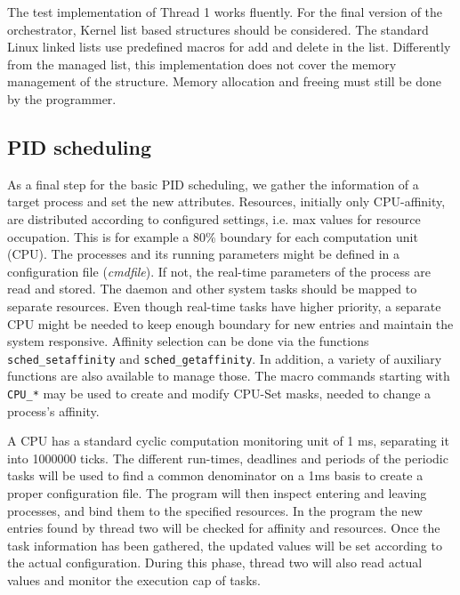 \documentclass[]{scrartcl}
\begin{document}
The test implementation of Thread 1 works fluently. For the final version of the orchestrator, Kernel list based structures should be considered. 
The standard Linux linked lists use predefined macros for add and delete in the list. Differently from the managed list, this implementation does not cover the memory management of the structure. Memory allocation and freeing must still be done by the programmer.

\subsection{PID scheduling}
 
As a final step for the basic PID scheduling, we gather the information of a target process and set the new attributes. 
Resources, initially only {CPU}-affinity, are distributed according to configured settings, i.e. max values for resource occupation. 
This is for example a 80\% boundary for each computation unit ({CPU}). 
The processes and its running parameters might be defined in a configuration file (\textit{cmdfile}). If not, the real-time parameters of the process are read and stored.
The daemon and other system tasks should be mapped to separate resources. Even though real-time tasks have higher priority, a separate CPU might be needed to keep enough boundary for new entries and maintain the system responsive.
Affinity selection can be done via the functions \texttt{sched\_setaffinity} and \texttt{sched\_getaffinity}.
In addition, a variety of auxiliary functions are also available to manage those. 
The macro commands starting with \texttt{CPU\_*} may be used to create and modify CPU-Set masks, needed to change a process's affinity.

A CPU has a standard cyclic computation monitoring unit of 1 ms, separating it into 1000000 ticks. 
The different run-times, deadlines and periods of the periodic tasks will be used to find a common denominator on a 1ms basis to create a proper configuration file. 
The program will then inspect entering and leaving processes, and bind them to the specified resources.
In the program the new entries found by thread two will be checked for affinity and resources.
Once the task information has been gathered, the updated values will be set according to the actual configuration.
During this phase, thread two will also read actual values and monitor the execution cap of tasks.
\end{document}
